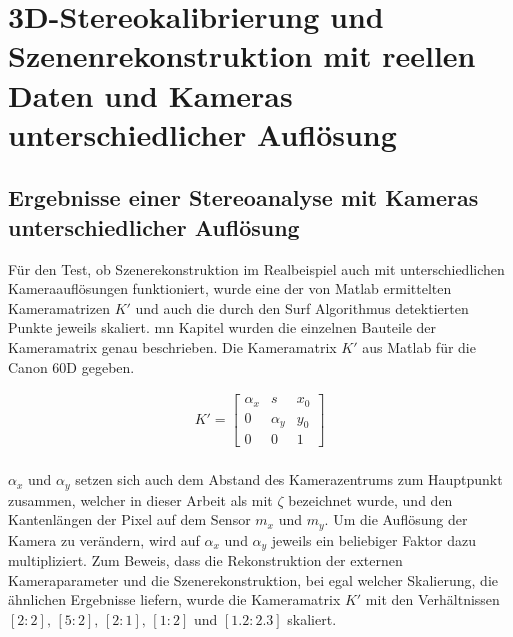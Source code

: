 \chapter{3D-Stereokalibrierung und Szenenrekonstruktion mit reellen Daten und Kameras unterschiedlicher Auflösung}
\label{sec:realAuf} 

\section{Ergebnisse einer Stereoanalyse mit Kameras unterschiedlicher Auflösung}

Für den Test, ob Szenerekonstruktion im Realbeispiel auch mit unterschiedlichen Kameraauflösungen funktioniert, wurde eine der von Matlab ermittelten Kameramatrizen $K'$ und auch die durch den Surf Algorithmus detektierten Punkte jeweils skaliert. mn Kapitel  wurden die einzelnen Bauteile der Kameramatrix genau beschrieben. Die Kameramatrix $K'$ aus Matlab für die Canon 60D gegeben.


\begin{gather}
		K'=\begin{bmatrix}
\alpha_x&s&x_{0}\\
0&\alpha_y&y_{0}\\
0&0&1
\end{bmatrix}
\end{gather} \\

$\alpha_x$ und $\alpha_y$ setzen sich auch dem Abstand des Kamerazentrums zum Hauptpunkt zusammen, welcher in dieser Arbeit als mit $\zeta$ bezeichnet wurde, und den Kantenlängen der Pixel auf dem Sensor $m_x$ und $m_y$. Um die Auflösung der Kamera zu verändern, wird auf $\alpha_x$ und $\alpha_y$ jeweils ein beliebiger Faktor dazu multipliziert. Zum Beweis, dass die Rekonstruktion der externen Kameraparameter und die Szenerekonstruktion, bei egal welcher Skalierung, die ähnlichen Ergebnisse liefern, wurde die Kameramatrix $K'$ mit den Verhältnissen $[2:2], \, [5:2],\, [2:1], \, [1:2]$ und $[1.2:2.3]$ skaliert. 

